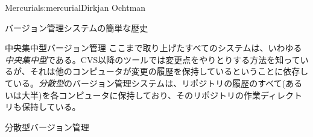\begin{aosachapter}{Mercurial}{s:mercurial}{Dirkjan Ochtman}
\begin{aosasect1}{バージョン管理システムの簡単な歴史}
\begin{aosasect2}{中央集中型バージョン管理}
ここまで取り上げたすべてのシステムは、いわゆる\emph{中央集中型}である。CVS以降のツールでは変更点をやりとりする方法を知っているが、それは他のコンピュータが変更の履歴を保持しているということに依存している。\emph{分散型}のバージョン管理システムは、リポジトリの履歴のすべて(あるいは大半)を各コンピュータに保持しており、そのリポジトリの作業ディレクトリも保持している。

\end{aosasect2}

\begin{aosasect2}{分散型バージョン管理}


\end{aosasect2}
\end{aosasect1}
\end{aosachapter}
